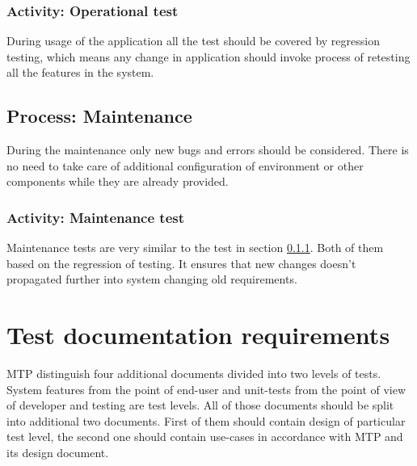 		\subsubsection{Activity: Operational test} \label{s:details-of-the-master-test-plan:activity-operational-test}
		During usage of the application all the test should be covered by regression testing, which means any change in application should invoke process of retesting all the features in the system.
	\subsection{Process: Maintenance} \label{s:details-of-the-master-test-plan:process-maintenance}
		During the maintenance only new bugs and errors should be considered. There is no need to take care of additional configuration of environment or other components while they are already provided.
		\subsubsection{Activity: Maintenance test} \label{s:details-of-the-master-test-plan:activity-maintenance-test}
		Maintenance tests are very similar to the test in section \ref{s:details-of-the-master-test-plan:activity-maintenance-test}. Both of them based on the regression of testing. It ensures that new changes doesn't propagated further into system changing old requirements. 
\section{Test documentation requirements} \label{s:details-of-the-master-test-plan:test-documentation-requirements}
	\begin{comment}
		$<$Define the purpose, format, and content of all other testing documents that are to be used (in addition to those that are defined in MTP Section 2.4). A description of these documents may be found in Clause 9 through Clause 16. If the test effort uses test documentation or test levels different from those in this standard (i.e., component, component integration, system, and acceptance), this section needs to map the documentation and process requirements to the test documentation contents defined in this standard. $>$
	\end{comment}
	\gls{MTP} distinguish four additional documents divided into two levels of tests. System features from the point of end-user and unit-tests from the point of view of developer and testing are test levels. All of those documents should be split into additional two documents. First of them should contain design of particular test level, the second one should contain use-cases in accordance with \gls{MTP} and its design document.
